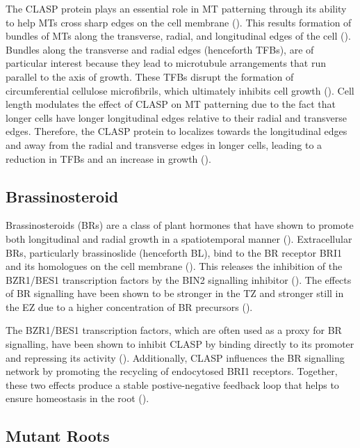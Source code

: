 \medskip

The CLASP protein plays an essential role in MT patterning through its ability to help MTs cross sharp edges on the cell membrane (\cite{ambrose2011}). This results formation of bundles of MTs along the transverse, radial, and longitudinal edges of the cell (\cite{halat2022}). Bundles along the transverse and radial edges (henceforth TFBs), are of particular interest because they lead to microtubule arrangements that run parallel to the axis of growth.
These TFBs disrupt the formation of circumferential cellulose microfibrils, which ultimately inhibits cell growth (\cite{halat2022}). Cell length modulates the effect of CLASP on MT patterning due to the fact that longer cells have longer longitudinal edges relative to their radial and transverse edges. Therefore, the CLASP protein to localizes towards the longitudinal edges and away from the radial and transverse edges in longer cells, leading to a reduction in TFBs and an increase in growth (\cite{halat2022}). 

\subsection{Brassinosteroid}

Brassinosteroids (BRs) are a class of plant hormones that have shown to promote both longitudinal and radial growth in a spatiotemporal manner (\cite{ackerman-lavert2020}). Extracellular BRs, particularly brassinoslide (henceforth BL), bind to the BR receptor BRI1 and its homologues on the cell membrane (\cite{vukasinovic2021}). This releases the inhibition of the BZR1/BES1 transcription factors by the BIN2 signalling inhibitor (\cite{ackerman-lavert2020}). The effects of BR signalling have been shown to be stronger in the TZ and stronger still in the EZ due to a higher concentration of BR precursors (\cite{vukasinovic2021}). 

\medskip

The BZR1/BES1 transcription factors, which are often used as a proxy for BR signalling, have been shown to inhibit CLASP by binding directly to its promoter and repressing its activity (\cite{ruan2018}). Additionally, CLASP influences the BR signalling network by promoting the recycling of endocytosed BRI1 receptors. Together, these two effects produce a stable postive-negative feedback loop that helps to ensure homeostasis in the root (\cite{ruan2018}).

\subsection{Mutant Roots}

